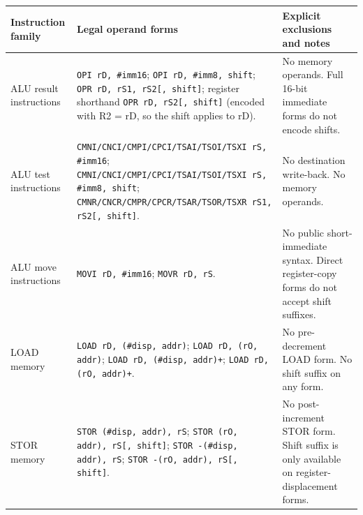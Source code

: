 \begin{table}[H]
	\centering
	\scriptsize
	\begin{tabularx}{\textwidth}{>{\raggedright\arraybackslash}p{2.2cm}>{\raggedright\arraybackslash}X>{\raggedright\arraybackslash}X}
		\toprule
		\textbf{Instruction family}    & \textbf{Legal operand forms}                                                                                                                                                                       & \textbf{Explicit exclusions and notes}                                                                                               \\
		\midrule
		ALU result instructions        & \texttt{OPI rD, \#imm16}; \texttt{OPI rD, \#imm8, shift}; \texttt{OPR rD, rS1, rS2[, shift]}; register shorthand \texttt{OPR rD, rS2[, shift]} (encoded with R2 = rD, so the shift applies to rD). & No memory operands. Full 16-bit immediate forms do not encode shifts.                                                                \\
		ALU test instructions          & \texttt{CMNI/CNCI/CMPI/CPCI/TSAI/TSOI/TSXI rS, \#imm16}; \texttt{CMNI/CNCI/CMPI/CPCI/TSAI/TSOI/TSXI rS, \#imm8, shift}; \texttt{CMNR/CNCR/CMPR/CPCR/TSAR/TSOR/TSXR rS1, rS2[, shift]}.             & No destination write-back. No memory operands.                                                                                       \\
		ALU move instructions          & \texttt{MOVI rD, \#imm16}; \texttt{MOVR rD, rS}.                                                                                                                                                   & No public short-immediate \mnemonic{MOVI} syntax. Direct register-copy forms do not accept shift suffixes.                           \\
		LOAD memory                    & \texttt{LOAD rD, (\#disp, addr)}; \texttt{LOAD rD, (rO, addr)}; \texttt{LOAD rD, (\#disp, addr)+}; \texttt{LOAD rD, (rO, addr)+}.                                                                  & No pre-decrement LOAD form. No shift suffix on any \mnemonic{LOAD} form.                                                             \\
		STOR memory                    & \texttt{STOR (\#disp, addr), rS}; \texttt{STOR (rO, addr), rS[, shift]}; \texttt{STOR -(\#disp, addr), rS}; \texttt{STOR -(rO, addr), rS[, shift]}.                                                & No post-increment STOR form. Shift suffix is only available on register-displacement \mnemonic{STOR} forms.                          \\

\end{tabularx}
\end{table}

